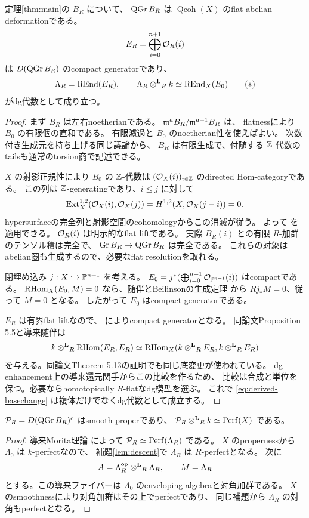 \begin{proposition}\label{prop:qgr}
 定理\ref{thm:main}の \(B_R\) について、
 \(\operatorname{QGr} B_R\) は \(\operatorname{Qcoh}(X)\) のflat abelian deformationである。
 \[
 E_R=\bigoplus_{i=0}^{n+1}\mathcal O_R(i)
 \]
 は \(D(\operatorname{QGr} B_R)\) のcompact generatorであり、
 \[
 \Lambda_R=\operatorname{REnd}(E_R),\qquad
 \Lambda_R\mathbin{\otimes^{\mathbf L}}_Rk\simeq\operatorname{REnd}_X(E_0)
 \tag{\(\ast\)}\label{eq:derived-basechange}
 \]
 がdg代数として成り立つ。
\end{proposition}
\begin{proof}
 まず \(B_R\) は左右noetherianである。
 \(\mathfrak m^aB_R/\mathfrak m^{a+1}B_R\) は、
 flatnessにより \(B_0\) の有限個の直和である。
 有限濾過と \(B_0\) のnoetherian性を使えばよい。
 次数付き生成元を持ち上げる同じ議論から、
 \(B_R\) は有限生成で、付随する \(\mathbb Z\)-代数のtailsも通常のtorsion商で記述できる。

 \(X\) の射影正規性により \(B_0\) の \(\mathbb Z\)-代数は
 \((\mathcal O_X(i))_{i\in\mathbb Z}\) のdirected Hom-categoryである。
 この列は \(\mathbb Z\)-generatingであり、\(i\le j\) に対して
 \[
 \operatorname{Ext}_X^{1,2}(\mathcal O_X(i),\mathcal O_X(j))
 =H^{1,2}(X,\mathcal O_X(j-i))=0.
 \]
 hypersurfaceの完全列と射影空間のcohomologyからこの消滅が従う。
 よって \cite[Theorem 4.5]{DDL} を適用できる。
 \(\mathcal O_R(i)\) は明示的なflat liftである。
 実際 \(B_R(i)\) との有限 \(R\)-加群のテンソル積は完全で、
 \(\operatorname{Gr}B_R\to\operatorname{QGr} B_R\) は完全である。
 これらの対象はabelian圏も生成するので、必要なflat resolutionを取れる。

 閉埋め込み \(j:X\hookrightarrow\mathbb P^{n+1}\) を考える。
 \(E_0=j^*(\bigoplus_{i=0}^{n+1}\mathcal O_{\mathbb P^{n+1}}(i))\) はcompactである。
 \(\operatorname{RHom}_X(E_0,M)=0\) なら、随伴とBeilinsonの生成定理
 \cite{Beilinson}から \(Rj_*M=0\)、従って \(M=0\) となる。
 したがって \(E_0\) はcompact generatorである。

 \(E_R\) は有界flat liftなので、
 \cite[Propositions 5.8, 5.9]{DDL} によりcompact generatorとなる。
 同論文Proposition 5.5と導来随伴は
 \[
 k\mathbin{\otimes^{\mathbf L}}_R\operatorname{RHom}(E_R,E_R)
 \simeq\operatorname{RHom}_X(k\mathbin{\otimes^{\mathbf L}}_RE_R,k\mathbin{\otimes^{\mathbf L}}_RE_R)
 \]
 を与える。同論文Theorem 5.13の証明でも同じ底変更が使われている。
 dg enhancement上の導来還元関手からこの比較を作るため、
 比較は合成と単位を保つ。必要ならhomotopically \(R\)-flatなdg模型を選ぶ。
 これで \eqref{eq:derived-basechange} は複体だけでなくdg代数として成立する。
\end{proof}

\begin{corollary}\label{cor:smooth-proper}
 \(\mathcal P_R=D(\operatorname{QGr} B_R)^c\) はsmooth properであり、
 \(\mathcal P_R\mathbin{\otimes^{\mathbf L}}_Rk\simeq\operatorname{Perf}(X)\) である。
\end{corollary}
\begin{proof}
 導来Morita理論 \cite{Keller} によって
 \(\mathcal P_R\simeq\operatorname{Perf}(\Lambda_R)\) である。
 \(X\) のpropernessから \(\Lambda_0\) は \(k\)-perfectなので、
 補題\ref{lem:descent}で \(\Lambda_R\) は \(R\)-perfectとなる。
 次に
 \[
 A=\Lambda_R^{\mathrm{op}}\mathbin{\otimes^{\mathbf L}}_R\Lambda_R,\qquad M=\Lambda_R
 \]
 とする。この導来ファイバーは \(\Lambda_0\) のenveloping algebraと対角加群である。
 \(X\) のsmoothnessにより対角加群はその上でperfectであり、
 同じ補題から \(\Lambda_R\) の対角もperfectとなる。
\end{proof}

